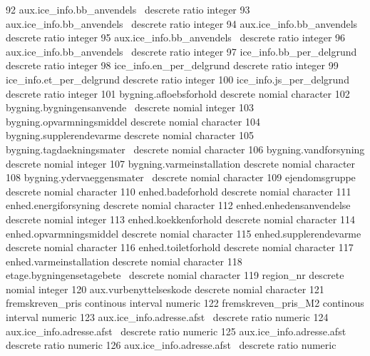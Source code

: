 \documentclass{report}
\begin{document}
\begin{Schunk}
\begin{Soutput}
 92 aux.ice_info.bb_anvendels~ descrete         ratio           integer         
 93 aux.ice_info.bb_anvendels~ descrete         ratio           integer         
 94 aux.ice_info.bb_anvendels~ descrete         ratio           integer         
 95 aux.ice_info.bb_anvendels~ descrete         ratio           integer         
 96 aux.ice_info.bb_anvendels~ descrete         ratio           integer         
 97 ice_info.bb_per_delgrund   descrete         ratio           integer         
 98 ice_info.en_per_delgrund   descrete         ratio           integer         
 99 ice_info.et_per_delgrund   descrete         ratio           integer         
100 ice_info.js_per_delgrund   descrete         ratio           integer         
101 bygning.afloebsforhold     descrete         nomial          character       
102 bygning.bygningensanvende~ descrete         nomial          integer         
103 bygning.opvarmningsmiddel  descrete         nomial          character       
104 bygning.supplerendevarme   descrete         nomial          character       
105 bygning.tagdaekningsmater~ descrete         nomial          character       
106 bygning.vandforsyning      descrete         nomial          integer         
107 bygning.varmeinstallation  descrete         nomial          character       
108 bygning.ydervaeggensmater~ descrete         nomial          character       
109 ejendomsgruppe             descrete         nomial          character       
110 enhed.badeforhold          descrete         nomial          character       
111 enhed.energiforsyning      descrete         nomial          character       
112 enhed.enhedensanvendelse   descrete         nomial          integer         
113 enhed.koekkenforhold       descrete         nomial          character       
114 enhed.opvarmningsmiddel    descrete         nomial          character       
115 enhed.supplerendevarme     descrete         nomial          character       
116 enhed.toiletforhold        descrete         nomial          character       
117 enhed.varmeinstallation    descrete         nomial          character       
118 etage.bygningensetagebete~ descrete         nomial          character       
119 region_nr                  descrete         nomial          integer         
120 aux.vurbenyttelseskode     descrete         nomial          character       
121 fremskreven_pris           continous        interval        numeric         
122 fremskreven_pris_M2        continous        interval        numeric         
123 aux.ice_info.adresse.afst~ descrete         ratio           numeric         
124 aux.ice_info.adresse.afst~ descrete         ratio           numeric         
125 aux.ice_info.adresse.afst~ descrete         ratio           numeric         
126 aux.ice_info.adresse.afst~ descrete         ratio           numeric         
\end{Soutput}
\end{Schunk}
\end{document}
